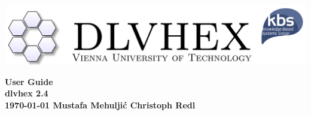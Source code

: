 \documentclass[a4paper, titlepage]{article}
\begin{document}
\setcounter{page}{3}
\newcommand{\dlvhex}{{\sc dlvhex}}
\newcommand{\hex}{{\sc hex}}
\newcommand{\dlv}{{\sc dlv}}
\newcommand{\dlvdb}{{\sc dlvdb}}
\newcommand{\libdlv}{{\sc libdlv}}
\newcommand{\libclingo}{{\sc libclingo}}
\newcommand{\genuineii}{{\sc genuineii}}
\newcommand{\genuinegi}{{\sc genuinegi}}
\newcommand{\genuineic}{{\sc genuineic}}
\newcommand{\genuinegc}{{\sc genuinegc}}

\setcounter{secnumdepth}{4} %
\setcounter{tocdepth}{4}    %

\newtheorem{exmp}{Example}[section]


\begin{titlepage}
    \centering
    \vfill
    \includegraphics[width=1.0\textwidth,natwidth=800,natheight=800]{biglogo_whitebg.png}
    \vfill
    {\bfseries\Large
        {\Huge User Guide} \\
        {\Large \dlvhex{} 2.4} \\
        \vskip0.5cm
	    {\Large \today}        
        \vskip4cm
        Mustafa Mehulji\'{c} \vskip1cm Christoph Redl
        \vskip4cm
        
    }    
    
\end{titlepage}
%
%
\begin{abstract}
This document provides a user guide for the Answer Set 
Programming (ASP) system called \dlvhex{} developed at 
Vienna University of Technology. ASP is a declarative 
problem solving paradigm, rooted in logic programming and 
nonmonotonic reasoning, which has been gaining increasing 
attention during the last years. The \dlvhex{} system is a 
reasoner for computing the models of so-called \hex{}-programs, which are an extension of \emph{answer-set 
programs} towards integration of \emph{external computation 
sources}. This guide aims at enabling users of this system 
to interoperate with a broad set of external computation 
sources. The guide refers to release 2.4.     
\end{abstract}
\end{document}
